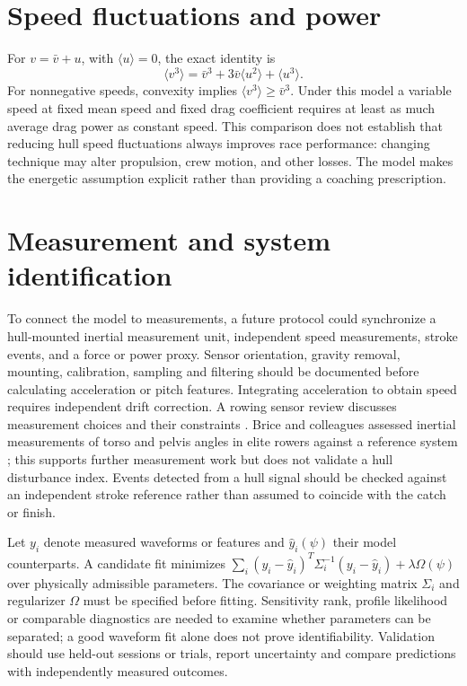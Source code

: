 \documentclass[11pt]{article}
\begin{document}
\section{Speed fluctuations and power}
For $v=\bar v+u$, with $\langle u\rangle=0$, the exact identity is
\begin{equation}\langle v^3\rangle=\bar v^3+3\bar v\langle u^2\rangle+\langle u^3\rangle.\end{equation}
For nonnegative speeds, convexity implies $\langle v^3\rangle\geq\bar v^3$. Under this model a variable speed at fixed mean speed and fixed drag coefficient requires at least as much average drag power as constant speed. This comparison does not establish that reducing hull speed fluctuations always improves race performance: changing technique may alter propulsion, crew motion, and other losses. The model makes the energetic assumption explicit rather than providing a coaching prescription.

\section{Measurement and system identification}
To connect the model to measurements, a future protocol could synchronize a hull-mounted inertial measurement unit, independent speed measurements, stroke events, and a force or power proxy. Sensor orientation, gravity removal, mounting, calibration, sampling and filtering should be documented before calculating acceleration or pitch features. Integrating acceleration to obtain speed requires independent drift correction. A rowing sensor review discusses measurement choices and their constraints \cite{worsey}. Brice and colleagues assessed inertial measurements of torso and pelvis angles in elite rowers against a reference system \cite{brice}; this supports further measurement work but does not validate a hull disturbance index. Events detected from a hull signal should be checked against an independent stroke reference rather than assumed to coincide with the catch or finish.

Let $y_i$ denote measured waveforms or features and $\hat y_i(\psi)$ their model counterparts. A candidate fit minimizes $\sum_i (y_i-\hat y_i)^T\Sigma_i^{-1}(y_i-\hat y_i)+\lambda\Omega(\psi)$ over physically admissible parameters. The covariance or weighting matrix $\Sigma_i$ and regularizer $\Omega$ must be specified before fitting. Sensitivity rank, profile likelihood or comparable diagnostics are needed to examine whether parameters can be separated; a good waveform fit alone does not prove identifiability. Validation should use held-out sessions or trials, report uncertainty and compare predictions with independently measured outcomes. 
\end{document}
